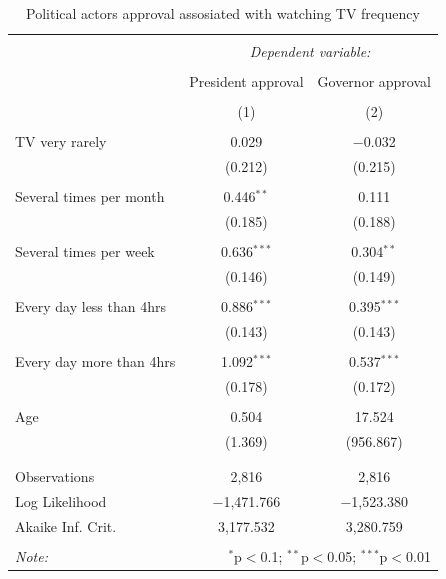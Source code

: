 \documentclass[
  english,
  man]{apa6}
\begin{document}
\begin{table}[!htbp] \centering 
  \caption{Political actors approval assosiated with watching TV frequency} 
  \label{} 
\small 
\begin{tabular}{@{\extracolsep{5pt}}lcc} 
\\[-1.8ex]\hline 
\hline \\[-1.8ex] 
 & \multicolumn{2}{c}{\textit{Dependent variable:}} \\ 
\cline{2-3} 
\\[-1.8ex] & President approval & Governor approval \\ 
\\[-1.8ex] & (1) & (2)\\ 
\hline \\[-1.8ex] 
 TV very rarely & 0.029 & $-$0.032 \\ 
  & (0.212) & (0.215) \\ 
  & & \\ 
 Several times per month & 0.446$^{**}$ & 0.111 \\ 
  & (0.185) & (0.188) \\ 
  & & \\ 
 Several times per week & 0.636$^{***}$ & 0.304$^{**}$ \\ 
  & (0.146) & (0.149) \\ 
  & & \\ 
 Every day less than 4hrs & 0.886$^{***}$ & 0.395$^{***}$ \\ 
  & (0.143) & (0.143) \\ 
  & & \\ 
 Every day more than 4hrs & 1.092$^{***}$ & 0.537$^{***}$ \\ 
  & (0.178) & (0.172) \\ 
  & & \\ 
 Age & 0.504 & 17.524 \\ 
  & (1.369) & (956.867) \\ 
  & & \\ 
\hline \\[-1.8ex] 
Observations & 2,816 & 2,816 \\ 
Log Likelihood & $-$1,471.766 & $-$1,523.380 \\ 
Akaike Inf. Crit. & 3,177.532 & 3,280.759 \\ 
\hline 
\hline \\[-1.8ex] 
\textit{Note:}  & \multicolumn{2}{r}{$^{*}$p$<$0.1; $^{**}$p$<$0.05; $^{***}$p$<$0.01} \\ 
\end{tabular} 
\end{table}
\end{document}
